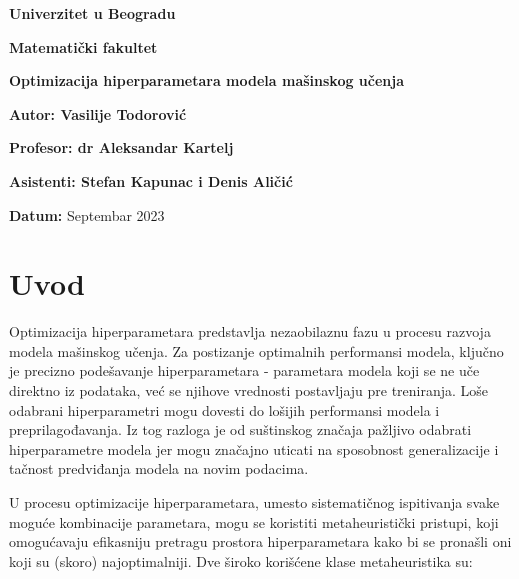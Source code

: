 \documentclass{article}
\begin{document}
\begin{titlepage}
    \begin{center}
        \large
        \textbf{Univerzitet u Beogradu}
        
        \vspace{0.5cm}
        
        \textbf{Matematički fakultet}
        
        \vspace{4cm}
        
        \textbf{Optimizacija hiperparametara modela mašinskog učenja}

        \vspace{3 cm}

        \textbf{Autor: Vasilije Todorović}
        \vspace{1 cm}
        
        \textbf{Profesor: dr Aleksandar Kartelj} 
        \vspace{1 cm}
        
        \textbf{Asistenti: Stefan Kapunac i Denis Aličić}

        \vspace{4 cm}
        
        \textbf{Datum:} Septembar 2023
        
    \end{center}
\end{titlepage}

\newpage 
\pagestyle{plain} 

\tableofcontents 

\newpage 

\section{Uvod}
\vspace{0.5 cm}
Optimizacija hiperparametara predstavlja nezaobilaznu fazu u procesu razvoja modela mašinskog učenja. Za postizanje optimalnih performansi modela, ključno je precizno podešavanje hiperparametara - parametara modela koji se ne uče direktno iz podataka, već se njihove vrednosti postavljaju pre treniranja. Loše odabrani hiperparametri mogu dovesti do lošijih performansi modela i preprilagođavanja. Iz tog razloga je od suštinskog značaja pažljivo odabrati hiperparametre modela jer mogu značajno uticati na sposobnost generalizacije i tačnost predviđanja modela na novim podacima.\newline

\noindent U procesu optimizacije hiperparametara, umesto sistematičnog ispitivanja svake moguće kombinacije parametara, mogu se koristiti metaheuristički pristupi, koji omogućavaju efikasniju pretragu prostora hiperparametara kako bi se pronašli oni koji su (skoro) najoptimalniji. Dve široko korišćene klase metaheuristika su:
\end{document}
